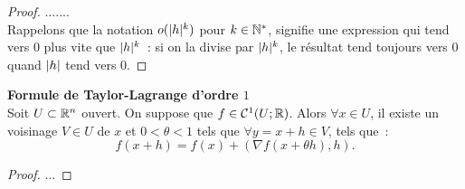 \begin{proof}
\(\hdots\)....\\
Rappelons que la notation \(o(\mathopen{}\left|h\right|\mathclose{}^k)\) pour \(k\in\mathbb{N}^*\), signifie une expression qui tend vers \(0\) plus vite que \(\mathopen{}\left|h\right|\mathclose{}^k\)~: si on la divise par \(\mathopen{}\left|h\right|\mathclose{}^k\), le résultat tend toujours vers \(0\) quand \(\mathopen{}\left|h\right|\mathclose{}\) tend vers \(0\).
\end{proof}

\vspace{1cm}
\begin{proposition}\label{taf6}\textbf{Formule de Taylor-Lagrange d'ordre \(1\)}\\
Soit \(U\subset \mathbb{R}^n\) ouvert. On suppose que \(f\in\mathcal{C}^1(U; \mathbb{R})\). Alors \(\forall x \in U\), il existe un voisinage \(V\in U\) de \(x\)  et \(0< \theta < 1\) tels que \(\forall y=x+h \in V\),  tels que~:
\begin{equation*}
f(x+h) = f(x) + \left(\nabla f(x+\theta h), h\right).
\end{equation*}
\end{proposition}
\begin{proof}
\(\hdots\)
\end{proof}